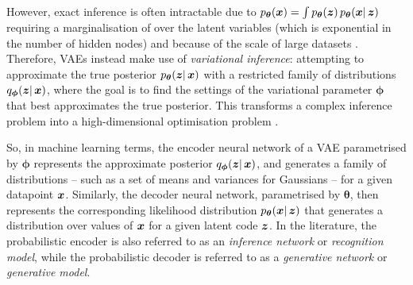 However, exact inference is often intractable due to $p_{\boldsymbol{\theta}}(\boldsymbol{x}) = \int p_{\boldsymbol{\theta}}(\boldsymbol{z}) \, p_{\boldsymbol{\theta}}(\boldsymbol{x} |\, \boldsymbol{z})$ requiring a marginalisation of over the latent variables (which is exponential in the number of hidden nodes) and because of the scale of large datasets \cite{variational_bayes}. Therefore, VAEs instead make use of \textit{variational inference}: attempting to approximate the true posterior $p_{\boldsymbol{\theta}}(\boldsymbol{z} |\, \boldsymbol{x})$ with a restricted family of distributions $q_{\boldsymbol{\phi}}(\boldsymbol{z} |\, \boldsymbol{x})$, where the goal is to find the settings of the variational parameter $\boldsymbol{\phi}$ that best approximates the true posterior. This transforms a complex inference problem into a high-dimensional optimisation problem \cite{stochastic_variational_inference, DeepLearningBook}.

So, in machine learning terms, the encoder neural network of a VAE parametrised by $\boldsymbol{\phi}$ represents the approximate posterior $q_{\boldsymbol{\phi}}(\boldsymbol{z} |\, \boldsymbol{x})$, and generates a family of distributions -- such as a set of means and variances for Gaussians -- for a given datapoint $\boldsymbol{x}$. Similarly, the decoder neural network, parametrised by $\boldsymbol{\theta}$, then represents the corresponding likelihood distribution $p_{\boldsymbol{\theta}}(\boldsymbol{x} |\, \boldsymbol{z})$ that generates a distribution over values of $\boldsymbol{x}$ for a given latent code $\boldsymbol{z}$. 
In the literature, the probabilistic encoder is also referred to as an \textit{inference network} or \textit{recognition model}, while the probabilistic decoder is referred to as a \textit{generative network} or \textit{generative model}.

